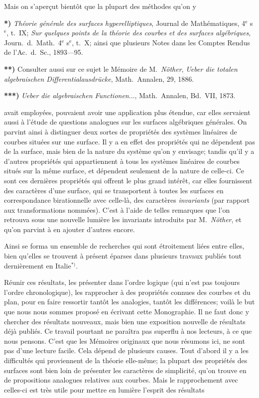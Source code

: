 \documentclass{article}
\begin{document}
Mais on s'aperçut bientôt que la plupart des méthodes qu'on y

\textbf{*)} \emph{Théorie générale des surfaces hyperelliptiques}, Journal de Mathématiques, 4${}^{\text{e}}$ s${}^{\text{e}}$, t.\ IX; \emph{Sur quelques points de la théorie des courbes et des surfaces algébriques}, Journ.\ d.\ Math.\ 4${}^{\text{e}}$ s${}^{\text{e}}$, t.\ X; ainsi que plusieurs Notes dans les Comptes Rendus de l'Ac.\ d.\ Sc., 1893---95.

\textbf{**)} Consulter aussi sur ce sujet le Mémoire de M.\ \emph{Nöther}, \emph{Ueber die totalen algebraischen Differentialausdrücke}, Math.\ Annalen, 29, 1886.

\textbf{***)} \emph{Ueber die algebraischen Functionen}..., Math.\ Annalen, Bd.\ VII, 1873.

avait employées, pouvaient avoir une application plus étendue, car elles servaient aussi à l'étude de questions analogues sur les surfaces algébriques générales. On parvint ainsi à distinguer deux sortes de propriétés des systèmes linéaires de courbes situées sur une surface. Il y a en effet des propriétés qui ne dépendent pas de la surface, mais bien de la nature du système qu'on y envisage; tandis qu'il y a d'autres propriétés qui appartiennent à tous les systèmes linéaires de courbes situés sur la même surface, et dépendent seulement de la nature de celle-ci. Ce sont ces dernières propriétés qui offrent le plus grand intérêt, car elles fournissent des caractères d'une surface, qui se transportent à toutes les surfaces en correspondance birationnelle avec celle-là, des caractères \emph{invariants} (par rapport aux transformations nommées). C'est à l'aide de telles remarques que l'on retrouva sous une nouvelle lumière les invariants introduits par M.\ \emph{Nöther}, et qu'on parvint à en ajouter d'autres encore.

Ainsi se forma un ensemble de recherches qui sont étroitement liées entre elles, bien qu'elles se trouvent à présent éparses dans plusieurs travaux publiés tout dernièrement en Italie${}^{*)}$.

Réunir ces résultats, les présenter dans l'ordre logique (qui n'est pas toujours l'ordre chronologique), les rapprocher à des propriétés connues des courbes et du plan, pour en faire ressortir tantôt les analogies, tantôt les différences; voilà le but que nous nous sommes proposé en écrivant cette Monographie. Il ne faut donc y chercher des résultats nouveaux, mais bien une exposition nouvelle de résultats déjà publiés. Ce travail pourtant ne paraîtra pas superflu à nos lecteurs, à ce que nous pensons. C'est que les Mémoires originaux que nous résumons ici, ne sont pas d'une lecture facile. Cela dépend de plusieurs causes. Tout d'abord il y a les difficultés qui proviennent de la théorie elle-même; la plupart des propriétés des surfaces sont bien loin de présenter les caractères de simplicité, qu'on trouve en de propositions analogues relatives aux courbes. Mais le rapprochement avec celles-ci est très utile pour mettre en lumière l'esprit des résultats
\end{document}

